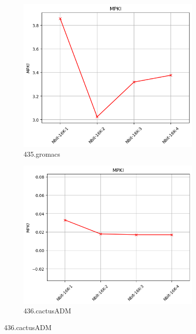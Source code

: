\documentclass{article}
\begin{document}
\begin{figure}[H]
    \ContinuedFloat
    \centering

    \begin{subfigure}[b]{0.45\textwidth}
        \includegraphics[width=\textwidth]{figures/5_3/435.gromacs.cslab_branch_preds_ref.out.png}
        \caption{435.gromacs}
        \label{fig:plot7}
    \end{subfigure}
    \hfill
    \begin{subfigure}[b]{0.45\textwidth}
        \includegraphics[width=\textwidth]{figures/5_3/436.cactusADM.cslab_branch_preds_ref.out.png}
        \caption{436.cactusADM}
        \label{fig:plot8}
    \end{subfigure}


\end{figure}
\end{document}
